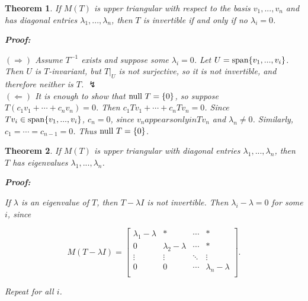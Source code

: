 \documentclass{article}
\theoremstyle{colontheorem}
\newtheorem{theorem}{Theorem}[section]
\newcommand{\Span}{\textnormal{span}}
\newcommand{\Null}{\textnormal{null }}
\newenvironment{Theorem}
{
	\begin{mdframed}[backgroundcolor=TheoremOrange!10]
	\begin{theorem}
}
{
	\end{theorem}
	\end{mdframed}
	
	\vspace{.15in}
}
\newenvironment{Proof}
{
	\begin{mdframed}[backgroundcolor=ProofPurple!10]
	\textbf{Proof:}%
}
{
	\end{mdframed}
	
	\vspace{.085in}
}
\begin{document}
\begin{Theorem}
	
	If $M(T)$ is upper triangular with respect to the basis $v_1, ..., v_n$ and has diagonal entries $\lambda_1, ..., \lambda_n$, then $T$ is invertible if and only if no $\lambda_i = 0$.
	
	\begin{Proof}
		$(\Rightarrow)$ Assume $T^{-1}$ exists and suppose some $\lambda_i = 0$. Let $U = \Span \{v_1, ..., v_i\}$. Then $U$ is $T$-invariant, but $T|_U$ is not surjective, so it is not invertible, and therefore neither is $T$. $\lightning$\\
		
		$(\Leftarrow)$ It is enough to show that $\Null T = \{0\}$, so suppose $T(c_1 v_1 + \cdots + c_n v_n) = 0$. Then $c_1 Tv_1 + \cdots + c_n Tv_n = 0$. Since $Tv_i \in \Span \{v_1, ..., v_i\}$, $c_n = 0$, since $v_n appears only in Tv_n$ and $\lambda_n \neq 0$. Similarly, $c_1 = \cdots = c_{n-1} = 0$. Thus $\Null T = \{0\}$.
		
	\end{Proof}
	
\end{Theorem}



\begin{Theorem}
	
		If $M(T)$ is upper triangular with diagonal entries $\lambda_1, ..., \lambda_n$, then $T$ has eigenvalues $\lambda_1, ..., \lambda_n$.
		
		\begin{Proof}
			If $\lambda$ is an eigenvalue of $T$, then $T - \lambda I$ is not invertible. Then $\lambda_i - \lambda = 0$ for some $i$, since
			
			$$
			M(T - \lambda I) = \begin{bmatrix}
				\lambda_1 - \lambda & * & \cdots & *\\
				0 & \lambda_2 - \lambda & \cdots & *\\
				\vdots & \vdots & \ddots & \vdots\\
				0 & 0 & \cdots & \lambda_n - \lambda\\
			\end{bmatrix}.
			$$
			
			Repeat for all $i$.
			
		\end{Proof}
	
\end{Theorem}
\end{document}
